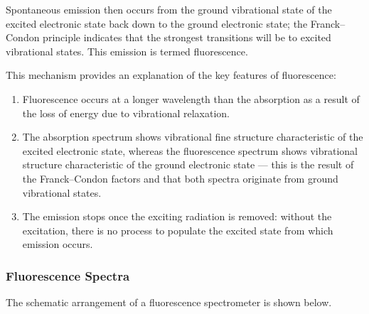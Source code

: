 \documentclass{article}
\theoremstyle{plain}\theoremheaderfont{\normalfont\itshape}\theorembodyfont{\rmfamily}\theoremseparator{.}\newtheorem*{rem}{Remark}\newtheorem*{ex}{Example}\newtheorem*{proof}{Proof}\newtheorem*{altp}{Alternative proof}
\theoremstyle{plain}\theoremheaderfont{\normalfont\bfseries}\theorembodyfont{\rmfamily}\theoremseparator{.}\newtheorem{thm}{Theorem}[section]\newtheorem{lem}[thm]{Lemma}\newtheorem{prop}[thm]{Proposition}\newtheorem*{cor}{Corollary}\newtheorem{defn}[thm]{Definition}\newtheorem{clm}[thm]{Claim}\newtheorem{clminproof}{Claim}\newtheorem{pos}{Postulate}[section]
\theoremstyle{break}\theoremheaderfont{\normalfont\itshape}\theorembodyfont{\rmfamily}\theoremseparator{.\medskip}\newtheorem*{proofskip}{Proof}\newtheorem*{exs}{Examples}\newtheorem*{rems}{Remarks}
\theoremstyle{break}\theoremheaderfont{\normalfont\bfseries}\theorembodyfont{\rmfamily}\theoremseparator{.\medskip}\newtheorem{lemskip}[thm]{Lemma}\newtheorem{defnskip}[thm]{Definition}\newtheorem{propskip}[thm]{Proposition}\newtheorem{thmskip}[thm]{Theorem}
\numberwithin{equation}{section}
\begin{document}
    Spontaneous emission then occurs from the ground vibrational state of the excited electronic state back down to the ground electronic state; the Franck--Condon principle indicates that the strongest transitions will be to excited vibrational states. This emission is termed fluorescence.

    This mechanism provides an explanation of the key features of fluorescence:
    \begin{enumerate}[topsep=0pt,label=(\roman*)]
        \item Fluorescence occurs at a longer wavelength than the absorption as a result of the loss of energy due to vibrational relaxation.
        \item The absorption spectrum shows vibrational fine structure characteristic of the excited electronic state, whereas the fluorescence spectrum shows vibrational structure characteristic of the ground electronic state --- this is the result of the Franck--Condon factors and that both spectra originate from ground vibrational states.
        \item The emission stops once the exciting radiation is removed: without the excitation, there is no process to populate the excited state from which emission occurs.
    \end{enumerate}

    \subsubsection{Fluorescence Spectra}
    The schematic arrangement of a fluorescence spectrometer is shown below.
    \begin{figure}[ht!]
        \centering
    \end{figure}
\end{document}
